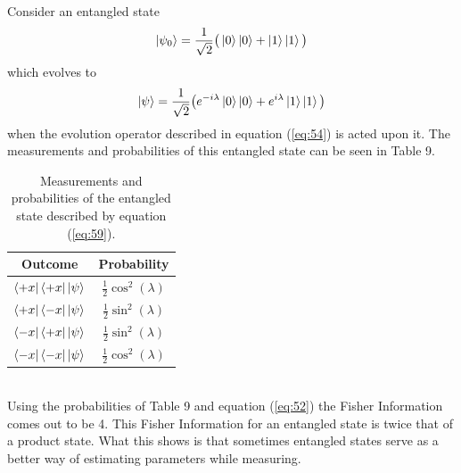 \documentclass[twocolumn]{article}
\begin{document}
Consider an entangled state
\begin{equation} \label{eq:59}
\ket{\psi_0}=\frac{1}{\sqrt{2}}\big(\ket{0}\ket{0}+\ket{1}\ket{1}\big)
\end{equation}
which evolves to 
\begin{equation} \label{eq:60}
\ket{\psi}=\frac{1}{\sqrt{2}}\big(e^{-i\lambda}\ket{0}\ket{0}+e^{i\lambda}\ket{1}\ket{1}\big)
\end{equation}
when the evolution operator described in equation (\ref{eq:54}) is acted upon it. The measurements and probabilities of this entangled state can be seen in Table 9.
\begin{table}[h!]
\begin{center}
\begin{tabular}{ |c|c| }
\hline Outcome & Probability \\
\hline $\bra{+x}\bra{+x}\ket{\psi}$ & $\frac{1}{2}\cos^2{(\lambda)}$ \\
\hline $\bra{+x}\bra{-x}\ket{\psi}$ & $\frac{1}{2}\sin^2{(\lambda)}$ \\
\hline $\bra{-x}\bra{+x}\ket{\psi}$ & $\frac{1}{2}\sin^2{(\lambda)}$ \\
\hline $\bra{-x}\bra{-x}\ket{\psi}$ & $\frac{1}{2}\cos^2{(\lambda)}$ \\
\hline
\end{tabular}
\caption{Measurements and probabilities of the entangled state described by equation (\ref{eq:59}).}
\end{center}
\end{table} \\
Using the probabilities of Table 9 and equation (\ref{eq:52}) the Fisher Information comes out to be 4. This Fisher Information for an entangled state is twice that of a product state. What this shows is that sometimes entangled states serve as a better way of estimating parameters while measuring.
\end{document}
